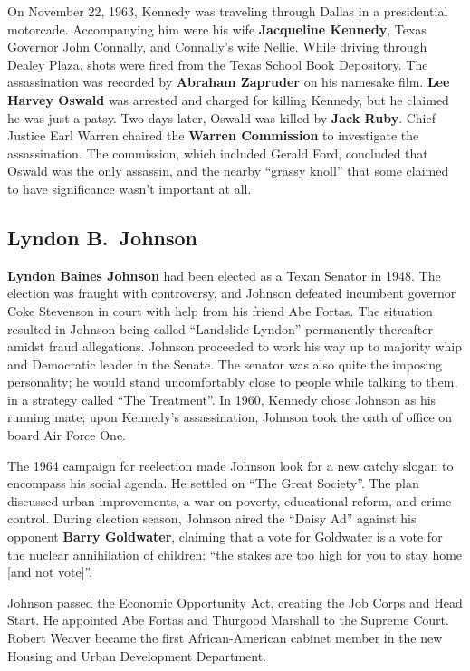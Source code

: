 On November 22, 1963, Kennedy was traveling through Dallas in a presidential motorcade.
Accompanying him were his wife \textbf{Jacqueline Kennedy}, Texas Governor John Connally, and Connally's wife Nellie.
While driving through Dealey Plaza, shots were fired from the Texas School Book Depository.
The assassination was recorded by \textbf{Abraham Zapruder} on his namesake film.
\textbf{Lee Harvey Oswald} was arrested and charged for killing Kennedy,
but he claimed he was just a patsy.
Two days later, Oswald was killed by \textbf{Jack Ruby}.
Chief Justice Earl Warren chaired the \textbf{Warren Commission} to investigate the assassination.
The commission, which included Gerald Ford, concluded that Oswald was the only assassin,
and the nearby ``grassy knoll'' that some claimed to have significance wasn't important at all.

\subsection*{Lyndon B.\ Johnson}

\textbf{Lyndon Baines Johnson} had been elected as a Texan Senator in 1948.
The election was fraught with controversy,
and Johnson defeated incumbent governor Coke Stevenson in court with help from his friend Abe Fortas.
The situation resulted in Johnson being called ``Landslide Lyndon'' permanently thereafter amidst fraud allegations.
Johnson proceeded to work his way up to majority whip and Democratic leader in the Senate.
The senator was also quite the imposing personality;
he would stand uncomfortably close to people while talking to them, in a strategy called ``The Treatment''.
In 1960, Kennedy chose Johnson as his running mate;
upon Kennedy's assassination, Johnson took the oath of office on board Air Force One.

The 1964 campaign for reelection made Johnson look for a new catchy slogan to encompass his social agenda.
He settled on ``The Great Society''.
The plan discussed urban improvements, a war on poverty, educational reform, and crime control.
During election season, Johnson aired the ``Daisy Ad'' against his opponent \textbf{Barry Goldwater},
claiming that a vote for Goldwater is a vote for the nuclear annihilation of children:
``the stakes are too high for you to stay home [and not vote]''.

Johnson passed the Economic Opportunity Act, creating the Job Corps and Head Start.
He appointed Abe Fortas and Thurgood Marshall to the Supreme Court.
Robert Weaver became the first African-American cabinet member in the new Housing and Urban Development Department.

